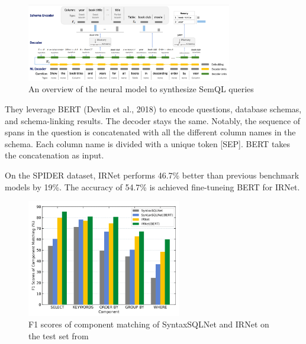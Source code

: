 \begin{figure}[htb]
    \centering
    \includegraphics[width=0.8\textwidth]{pics/IRNet/overview}
    \caption{An overview of the neural model to synthesize SemQL queries\cite{DBLP:journals/corr/abs-1905-08205}}
    \label{fig:overview}
\end{figure}

They leverage BERT (Devlin et al., 2018) to encode questions, database schemas, and schema-linking results. The decoder stays the same. Notably, the sequence of spans in the question is concatenated with all the different column names in the schema. Each column name is divided with a unique token [SEP]. BERT takes the concatenation as input.

On the SPIDER dataset, IRNet performs 46.7\% better than previous benchmark models by 19\%. The accuracy of 54.7\% is achieved fine-tuneing BERT for IRNet.

\begin{figure}[htb]
    \centering
    \includegraphics[width=0.6\textwidth]{pics/IRNet/f1}
    \caption{F1 scores of component matching of SyntaxSQLNet and IRNet on the test set from \cite{DBLP:journals/corr/abs-1905-08205}}
    \label{fig:f1}
\end{figure}
